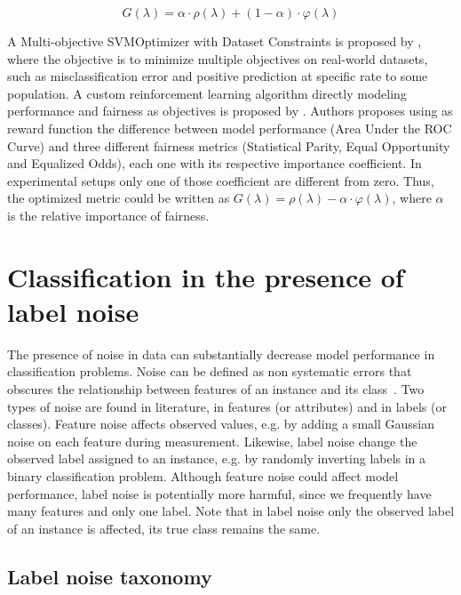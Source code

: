 \begin{equation} \label{eq:moo_smoothed_2}
    G(\lambda) = \alpha \cdot \rho(\lambda) + (1-\alpha) \cdot \varphi(\lambda)
\end{equation}

A Multi-objective SVMOptimizer with Dataset Constraints is proposed by \cite{Goh2016}, where the objective is to minimize multiple objectives on real-world datasets, such as misclassification error and positive prediction at specific rate to some population. A custom reinforcement learning algorithm directly modeling performance and fairness as objectives is proposed by \cite{Petrovic2021}. Authors proposes using as reward function the difference between model performance (Area Under the ROC Curve) and three different fairness metrics (Statistical Parity, Equal Opportunity and Equalized Odds), each one with its respective importance coefficient. In experimental setups only one of those coefficient are different from zero. Thus, the optimized metric could be written as $G(\lambda) = \rho(\lambda) - \alpha \cdot \varphi(\lambda)$, where $\alpha$ is the relative importance of fairness.


\section{Classification in the presence of label noise}

The presence of noise in data can substantially decrease model performance in classification problems. Noise can be defined as non systematic errors that obscures the relationship between features of an instance and its class~\citep{Frenay2014,Hickey1996,Quinlan1986}. Two types of noise are found in literature, in features (or attributes) and in labels (or classes). Feature noise affects observed values, e.g. by adding a small Gaussian noise on each feature during measurement. Likewise, label noise change the observed label assigned to an instance, e.g. by randomly inverting labels in a binary classification problem. Although feature noise could affect model performance, label noise is potentially more harmful, since we frequently have many features and only one label. Note that in label noise only the observed label of an instance is affected, its true class remains the same.

\subsection{Label noise taxonomy}

